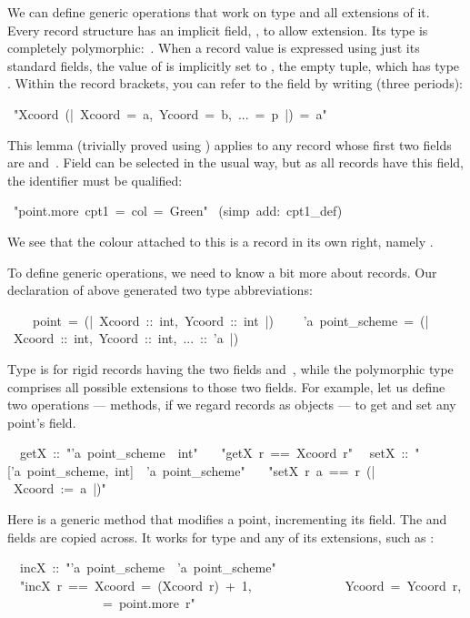 We can define generic operations that work on type  and all
extensions of it. 
Every record structure has an implicit field, , to allow
extension.  Its type is completely polymorphic:~.  When a
record value is expressed using just its standard fields, the value of
 is implicitly set to \isa{()}, the empty tuple, which has
type .  Within the record brackets, you can refer to the
 field by writing  (three periods):
\begin{isabelle}
\ "Xcoord\ (|\ Xcoord\ =\ a,\ Ycoord\ =\ b,\ ...\ =\ p\ |)\ =\ a"
\end{isabelle}
This lemma (trivially proved using ) applies to any
record whose first two fields are  and~.  Field
 can be selected in the usual way, but as all records have
this field, the identifier must be qualified:
\begin{isabelle}
\ "point.more\ cpt1\ =\ \isasymlparr col\ =\ Green\isasymrparr "\isanewline
{}\ (simp\ add:\ cpt1_def)
\end{isabelle}
%
We see that the colour attached to this  is a record in its
own right, namely 
.

To define generic operations, we need to know a bit more about records.
Our declaration of  above generated two type
abbreviations:
\begin{isabelle}
\ \ \ \ point\ =\ (|\ Xcoord\ ::\ int,\ Ycoord\ ::\ int\ |)\isanewline
\ \ \ \ 'a\ point_scheme\ =\ (|\ Xcoord\ ::\ int,\ Ycoord\ ::\ int,\ ...\ ::\ 'a\ |)
\end{isabelle}
%
Type  is for rigid records having the two fields
 and~, while the polymorphic type 
comprises all possible extensions to those two fields.  For example,
let us define two operations --- methods, if we regard records as
objects --- to get and set any point's
 field. 
\begin{isabelle}
\ \ getX\ ::\ "'a\ point_scheme\ \isasymRightarrow \ int"\isanewline
\ \ \ "getX\ r\ ==\ Xcoord\ r"\isanewline
\ \ setX\ ::\ "['a\ point_scheme,\ int]\ \isasymRightarrow \ 'a\ point_scheme"\isanewline
\ \ \ "setX\ r\ a\ ==\ r\ (|\ Xcoord\ :=\ a\ |)"
\end{isabelle}

Here is a generic method that modifies a point, incrementing its
 field.  The  and  fields
are copied across.  It works for type  and any of its
extensions, such as :
\begin{isabelle}
\isanewline
\ \ incX\ ::\ "'a\ point_scheme\ \isasymRightarrow \ 'a\ point_scheme"\isanewline
\ \ "incX\ r\ ==\ \isasymlparr Xcoord\ =\ (Xcoord\ r)\ +\ 1,\isanewline
\ \ \ \ \ \ \ \ \ \ \ \ \ \ Ycoord\ =\ Ycoord\ r,\isanewline
\ \ \ \ \ \ \ \ \ \ \ \ \ \ \isasymdots \ =\ point.more\
r\isasymrparr"
\end{isabelle}


